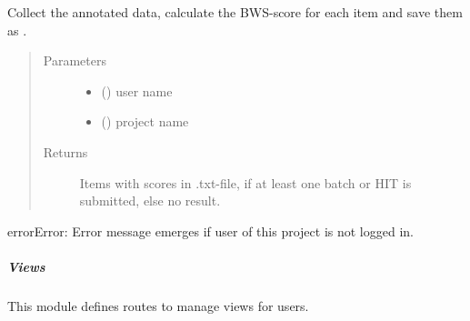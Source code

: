 \documentclass[a4paper,12pt,english]{sphinxmanual}
\begin{document}
\begin{fulllineitems}
\label{\detokenize{project_rst/user_rst/routes:project.user.outputs.get_scores}}
Collect the annotated data, calculate the BWS-score for each item
and save them as .
\begin{quote}\begin{description}
\item[{Parameters}] \leavevmode\begin{itemize}
\item {} 
 () \textendash{} user name

\item {} 
 () \textendash{} project name

\end{itemize}

\item[{Returns}] \leavevmode
Items with scores in .txt-file, if at least one batch or HIT is submitted, else no result.

\end{description}\end{quote}

\begin{sphinxadmonition}{error}{Error:}
Error message emerges if user of this project is not logged in.
\end{sphinxadmonition}

\end{fulllineitems}

\label{\detokenize{project_rst/user_rst/routes:module-project.user.views}}

\subparagraph{Views}
\label{\detokenize{project_rst/user_rst/routes:views}}
 

This module defines routes to manage views for users.
\end{document}
